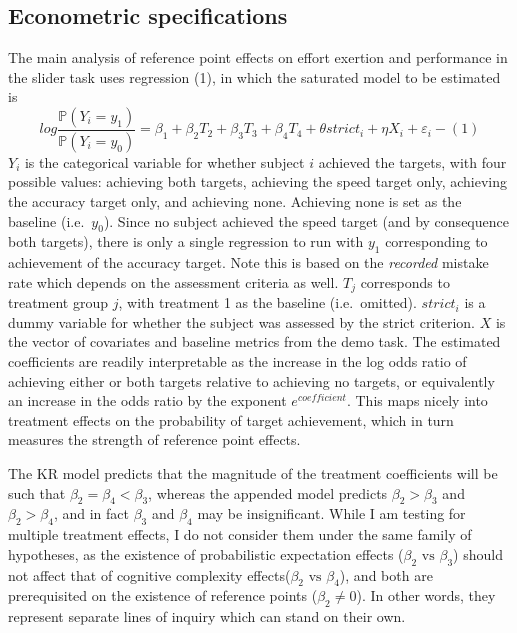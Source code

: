 \documentclass[
  12,
  letterpaper,
  DIV=11,
  numbers=noendperiod]{scrartcl}
\begin{document}
\subsection{Econometric
specifications}\label{econometric-specifications}

The main analysis of reference point effects on effort exertion and
performance in the slider task uses regression (1), in which the
saturated model to be estimated is \[
log \frac {\mathbb{P}(Y_i = y_1)}{\mathbb{P}(Y_i = y_0)} = \beta_{1} + \beta_2 T_2 +\beta_3 T_3 +\beta_4 T_4 + \theta strict_i + \eta X_i + \varepsilon_i -(1)
\] \(Y_i\) is the categorical variable for whether subject \(i\)
achieved the targets, with four possible values: achieving both targets,
achieving the speed target only, achieving the accuracy target only, and
achieving none. Achieving none is set as the baseline (i.e.~\(y_0\)).
Since no subject achieved the speed target (and by consequence both
targets), there is only a single regression to run with \(y_1\)
corresponding to achievement of the accuracy target. Note this is based
on the \emph{recorded} mistake rate which depends on the assessment
criteria as well. \(T_j\) corresponds to treatment group \(j\), with
treatment 1 as the baseline (i.e.~omitted). \(strict_i\) is a dummy
variable for whether the subject was assessed by the strict criterion.
\(X\) is the vector of covariates and baseline metrics from the demo
task. The estimated coefficients are readily interpretable as the
increase in the log odds ratio of achieving either or both targets
relative to achieving no targets, or equivalently an increase in the
odds ratio by the exponent \(e^{coefficient}\). This maps nicely into
treatment effects on the probability of target achievement, which in
turn measures the strength of reference point effects.

The KR model predicts that the magnitude of the treatment coefficients
will be such that \(\beta_2 = \beta_4 < \beta_3\), whereas the appended
model predicts \(\beta_2 > \beta_3\) and \(\beta_2 > \beta_4\), and in
fact \(\beta_3\) and \(\beta_4\) may be insignificant. While I am
testing for multiple treatment effects, I do not consider them under the
same family of hypotheses, as the existence of probabilistic expectation
effects (\(\beta_2 \text{ vs } \beta_3\)) should not affect that of
cognitive complexity effects(\(\beta_2 \text{ vs } \beta_4\)), and both
are prerequisited on the existence of reference points
(\(\beta_2 \neq 0\)). In other words, they represent separate lines of
inquiry which can stand on their own.
\end{document}

